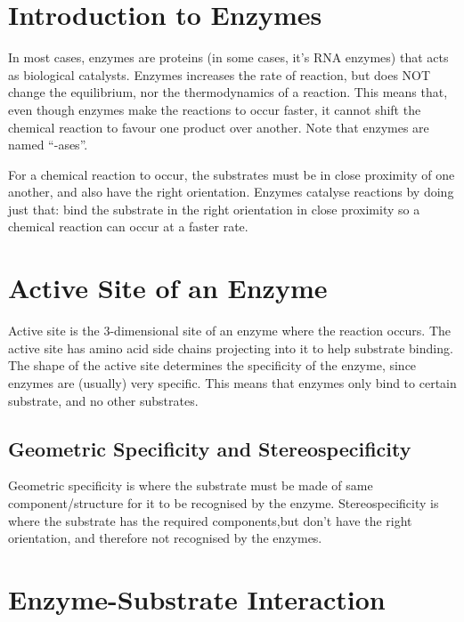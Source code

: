 \section{Introduction to Enzymes}

In most cases, enzymes are proteins (in some cases, it's RNA enzymes) that acts as biological catalysts.
Enzymes increases the rate of reaction, but does NOT change the equilibrium, nor the thermodynamics of a reaction.
This means that, even though enzymes make the reactions to occur faster, it cannot shift the chemical reaction to favour one product over another.
Note that enzymes are named ``-ases''.

For a chemical reaction to occur, the substrates must be in close proximity of one another, and also have the right orientation.
Enzymes catalyse reactions by doing just that: bind the substrate in the right orientation in close proximity so a chemical reaction can occur at a faster rate.

\section{Active Site of an Enzyme}

Active site is the 3-dimensional site of an enzyme where the reaction occurs.
The active site has amino acid side chains projecting into it to help substrate binding.
The shape of the active site determines the specificity of the enzyme, since enzymes are (usually) very specific.
This means that enzymes only bind to certain substrate, and no other substrates.

\subsection{Geometric Specificity and Stereospecificity}

\begin{center}
\end{center}
Geometric specificity is where the substrate must be made of same component/structure for it to be recognised by the enzyme.
Stereospecificity is where the substrate has the required components,but don't have the right orientation, and therefore not recognised by the enzymes.

\section{Enzyme-Substrate Interaction}


